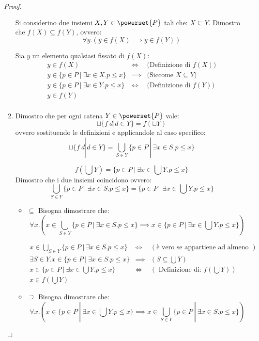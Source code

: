 \begin{proof}
\begin{enumerate}
    Si considerino due insiemi $X, Y \in \powerset{P}$ tali che:
    $X \subseteq Y$. Dimostro che $f(X) \subseteq f(Y)$, ovvero:
    $$
    \forall y.(y \in f(X) \implies y \in f(Y))
    $$
    
    Sia $y$ un elemento qualsiasi fissato di $f(X)$:
    $$
    \begin{array}{llr}
     y \in f(X) & \iff & \text{(Definizione di $f(X))$}\\
     y \in \{p \in P\ |\ \exists x \in X. p \leq x \} & \implies & \text{(Siccome $X \subseteq Y$) } \\
     y \in \{p \in P\ |\ \exists x \in Y. p \leq x \} & \iff &
     \text{(Definizione di $f(Y)$)} \\
     y \in f(Y) & & \\
    \end{array}
    $$

\item Dimostro che per ogni catena $Y \in \powerset{P}$ vale:  
$$
\sqcup\{f\ d | d \in Y\} = f(\sqcup Y)
$$
ovvero sostituendo le definizioni e applicandole al caso specifico:
$$
\sqcup\{f\ d | d \in Y\} = \bigcup_{S \in Y} \{p \in P\ |\ \exists x \in S. p \leq x\}
$$

$$
f(\bigcup Y) = \{p \in P\ |\ \exists x \in \bigcup Y. p \leq x\}
$$
Dimostro che i due insiemi coincidono ovvero:
$$
\bigcup_{S \in Y} \{p \in P\ |\ \exists x \in S. p \leq x\} =  \{p \in P\ |\ \exists x \in \bigcup Y. p \leq x\}
$$
\begin{itemize}
	\item $\boxed{\subseteq}$ Bisogna dimostrare che:
	$$
	\forall x . (x \in \bigcup_{S \in Y} \{p \in P\ |\ \exists x 
        \in S. p \leq x\} \implies x \in \{p \in P\ |\ \exists x \in \bigcup 
        Y. p \leq x\})
	$$
	
	$$
	\begin{array}{llr}
	x \in \bigcup_{S \in Y} \{p \in P\ |\ \exists x \in S. p \leq x\} & \iff & (\text{è vero se appartiene ad almeno un sottinsieme di Y})\\
	\exists S \in Y. x \in \{p \in P\ |\ \exists x \in S. p \leq x\} & \implies & (S \subseteq \bigcup Y)\\
	x \in \{p \in P\ |\ \exists x \in \bigcup Y. p \leq x \} & \iff & (\text{ Definizione di: } f(\bigcup Y)) \\
	x \in f(\bigcup Y)
	\end{array}
	$$
	\item $\boxed{\supseteq}$ Bisogna dimostrare che:
	$$
	\forall x .(x \in \{p \in P\ |\ \exists x \in \bigcup Y. p \leq x\} 
        \implies x \in \bigcup_{S \in Y} \{p \in P\ |\ \exists x \in S. p 
        \leq x\}) 
	$$ 
	

\end{itemize}
\end{enumerate}
\end{proof}
